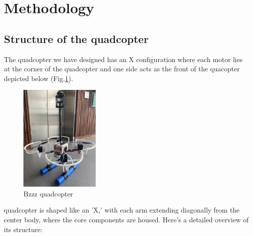 \documentclass{article}
\begin{document}
\section{Methodology}
\subsection{Structure of the quadcopter}
The quadcopter we have designed has an X configuration where each motor lies at
the corner of the quadcopter and one side acts as the front of the quacopter
depicted below (Fig.\ref{fig:QuadDiagram}). 

\begin{figure}[h] %
  \centering
  \includegraphics[width=0.35\textwidth]{Pictures/Quad.jpg} 
  \caption{Bzzz quadcopter}
  \label{fig:QuadDiagram}
\end{figure}

quadcopter is shaped like an 'X,' with each arm extending diagonally from the
center body, where the core components are housed. Here's a detailed overview of
its structure:
\end{document}
